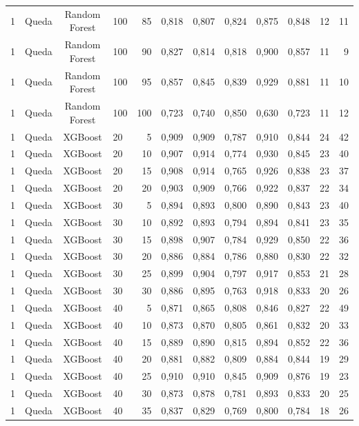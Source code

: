 \begin{longtable}{ccclrrrrrrrr}
1 & Queda & Random Forest & 100 & 85 & 0,818 & 0,807 & 0,824 & 0,875 & 0,848 & 12 & 11 \\
1 & Queda & Random Forest & 100 & 90 & 0,827 & 0,814 & 0,818 & 0,900 & 0,857 & 11 & 9 \\
1 & Queda & Random Forest & 100 & 95 & 0,857 & 0,845 & 0,839 & 0,929 & 0,881 & 11 & 10 \\
1 & Queda & Random Forest & 100 & 100 & 0,723 & 0,740 & 0,850 & 0,630 & 0,723 & 11 & 12 \\
1 & Queda & XGBoost & 20 & 5 & 0,909 & 0,909 & 0,787 & 0,910 & 0,844 & 24 & 42 \\
1 & Queda & XGBoost & 20 & 10 & 0,907 & 0,914 & 0,774 & 0,930 & 0,845 & 23 & 40 \\
1 & Queda & XGBoost & 20 & 15 & 0,908 & 0,914 & 0,765 & 0,926 & 0,838 & 23 & 37 \\
1 & Queda & XGBoost & 20 & 20 & 0,903 & 0,909 & 0,766 & 0,922 & 0,837 & 22 & 34 \\
1 & Queda & XGBoost & 30 & 5 & 0,894 & 0,893 & 0,800 & 0,890 & 0,843 & 23 & 40 \\
1 & Queda & XGBoost & 30 & 10 & 0,892 & 0,893 & 0,794 & 0,894 & 0,841 & 23 & 35 \\
1 & Queda & XGBoost & 30 & 15 & 0,898 & 0,907 & 0,784 & 0,929 & 0,850 & 22 & 36 \\
1 & Queda & XGBoost & 30 & 20 & 0,886 & 0,884 & 0,786 & 0,880 & 0,830 & 22 & 32 \\
1 & Queda & XGBoost & 30 & 25 & 0,899 & 0,904 & 0,797 & 0,917 & 0,853 & 21 & 28 \\
1 & Queda & XGBoost & 30 & 30 & 0,886 & 0,895 & 0,763 & 0,918 & 0,833 & 20 & 26 \\
1 & Queda & XGBoost & 40 & 5 & 0,871 & 0,865 & 0,808 & 0,846 & 0,827 & 22 & 49 \\
1 & Queda & XGBoost & 40 & 10 & 0,873 & 0,870 & 0,805 & 0,861 & 0,832 & 20 & 33 \\
1 & Queda & XGBoost & 40 & 15 & 0,889 & 0,890 & 0,815 & 0,894 & 0,852 & 22 & 36 \\
1 & Queda & XGBoost & 40 & 20 & 0,881 & 0,882 & 0,809 & 0,884 & 0,844 & 19 & 29 \\
1 & Queda & XGBoost & 40 & 25 & 0,910 & 0,910 & 0,845 & 0,909 & 0,876 & 19 & 23 \\
1 & Queda & XGBoost & 40 & 30 & 0,873 & 0,878 & 0,781 & 0,893 & 0,833 & 20 & 25 \\
1 & Queda & XGBoost & 40 & 35 & 0,837 & 0,829 & 0,769 & 0,800 & 0,784 & 18 & 26 \\

\end{longtable}
